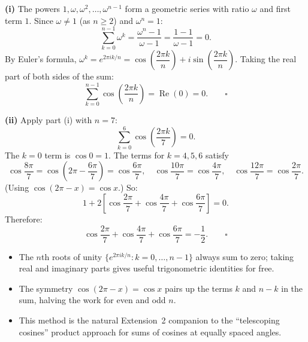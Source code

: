 \begin{solution}

\textbf{(i)} The powers $1, \omega, \omega^2, \ldots, \omega^{n-1}$ form a geometric series
with ratio $\omega$ and first term $1$. Since $\omega \ne 1$ (as $n \ge 2$) and $\omega^n = 1$:
\[
\sum_{k=0}^{n-1} \omega^k = \frac{\omega^n - 1}{\omega - 1} = \frac{1-1}{\omega-1} = 0.
\]
By Euler's formula, $\omega^k = e^{2\pi i k/n} = \cos\!\left(\dfrac{2\pi k}{n}\right) + i\sin\!\left(\dfrac{2\pi k}{n}\right)$.
Taking the real part of both sides of the sum:
\[
\sum_{k=0}^{n-1} \cos\!\left(\frac{2\pi k}{n}\right) = \operatorname{Re}(0) = 0. \qquad\square
\]

\medskip
\textbf{(ii)} Apply part (i) with $n = 7$:
\[
\sum_{k=0}^{6} \cos\!\left(\frac{2\pi k}{7}\right) = 0.
\]
The $k = 0$ term is $\cos 0 = 1$. The terms for $k = 4, 5, 6$ satisfy
\[
\cos\!\frac{8\pi}{7} = \cos\!\!\left(2\pi - \frac{6\pi}{7}\right) = \cos\!\frac{6\pi}{7}, \quad
\cos\!\frac{10\pi}{7} = \cos\!\frac{4\pi}{7}, \quad
\cos\!\frac{12\pi}{7} = \cos\!\frac{2\pi}{7}.
\]
(Using $\cos(2\pi - x) = \cos x$.) So:
\[
1 + 2\!\left[\cos\!\frac{2\pi}{7} + \cos\!\frac{4\pi}{7} + \cos\!\frac{6\pi}{7}\right] = 0.
\]
Therefore:
\[
\cos\!\frac{2\pi}{7} + \cos\!\frac{4\pi}{7} + \cos\!\frac{6\pi}{7}
= -\frac{1}{2}. \qquad\square
\]

\end{solution}

\begin{takeaways}
\begin{itemize}[leftmargin=*]
  \item The $n$th roots of unity $\{e^{2\pi i k/n} : k = 0, \ldots, n-1\}$ always sum to zero;
        taking real and imaginary parts gives useful trigonometric identities for free.
  \item The symmetry $\cos(2\pi - x) = \cos x$ pairs up the terms $k$ and $n-k$ in the sum,
        halving the work for even and odd $n$.
  \item This method is the natural Extension~2 companion to the ``telescoping cosines'' product
        approach for sums of cosines at equally spaced angles.
\end{itemize}
\end{takeaways}

